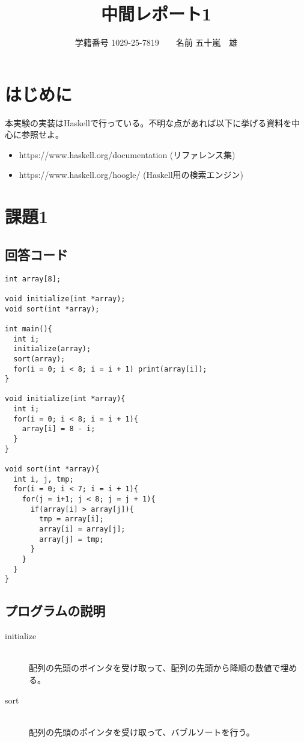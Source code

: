 \documentclass{jsarticle}
\begin{document}
\title{中間レポート1}
\author{学籍番号 1029-25-7819　　名前 五十嵐　雄}
\date{}
\maketitle

\section{はじめに}
本実験の実装はHaskellで行っている。不明な点があれば以下に挙げる資料を中心に参照せよ。
\begin{itemize}
\item https://www.haskell.org/documentation (リファレンス集)
\item https://www.haskell.org/hoogle/ (Haskell用の検索エンジン)
\end{itemize}

\section{課題1}
\subsection{回答コード}
\begin{verbatim}
int array[8];

void initialize(int *array);
void sort(int *array);

int main(){
  int i;
  initialize(array);
  sort(array);
  for(i = 0; i < 8; i = i + 1) print(array[i]);
}

void initialize(int *array){
  int i;
  for(i = 0; i < 8; i = i + 1){
    array[i] = 8 - i;
  }
}

void sort(int *array){
  int i, j, tmp;
  for(i = 0; i < 7; i = i + 1){
    for(j = i+1; j < 8; j = j + 1){
      if(array[i] > array[j]){
        tmp = array[i];
        array[i] = array[j];
        array[j] = tmp;
      }
    }
  }
}
\end{verbatim}
\subsection{プログラムの説明}
\begin{description}
\item[initialize] \mbox{} \\
配列の先頭のポインタを受け取って、配列の先頭から降順の数値で埋める。
\item[sort] \mbox{} \\
 配列の先頭のポインタを受け取って、バブルソートを行う。
\end{description}
\end{document}
